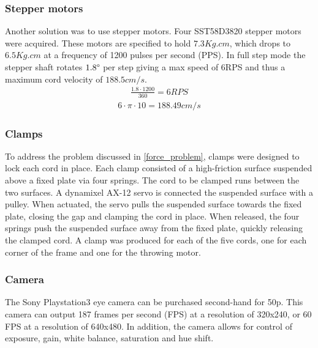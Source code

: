 \documentclass[conference]{IEEEtran}
\begin{document}
\subsubsection{Stepper motors}
Another solution was to use stepper motors. Four SST58D3820 stepper motors were acquired. These motors are specified to hold $7.3Kg.cm$, which drops to $6.5Kg.cm$ at a frequency of 1200 pulses per second (PPS). In full step mode the stepper shaft rotates $1.8\degree$ per step giving a max speed of 6RPS and thus a maximum cord velocity of $188.5cm/s$. \begin{equation}
\begin{aligned}
\frac{1.8\cdot 1200}{360} = 6 RPS
\end{aligned}
\end{equation}
\begin{equation}
\begin{aligned}
6\cdot\pi\cdot 10 = 188.49cm/s
\end{aligned}
\end{equation}
\subsubsection{Clamps}
To address the problem discussed in \ref{force_problem}, clamps were designed to lock each cord in place. Each clamp consisted of a high-friction surface suspended above a fixed plate via four springs. The cord to be clamped runs between the two surfaces. A dynamixel AX-12 servo is connected the suspended surface with a pulley. When actuated, the servo pulls the suspended surface towards the fixed plate, closing the gap and clamping the cord in place. When released, the four springs push the suspended surface away from the fixed plate, quickly releasing the clamped cord. A clamp was produced for each of the five cords, one for each corner of the frame and one for the throwing motor.

\subsubsection{Camera}
The Sony Playstation3 eye camera can be purchased second-hand for 50p. This camera can output 187 frames per second (FPS) at a resolution of 320x240, or 60 FPS at a resolution of 640x480. In addition, the camera allows for control of exposure, gain, white balance, saturation and hue shift.
\end{document}
